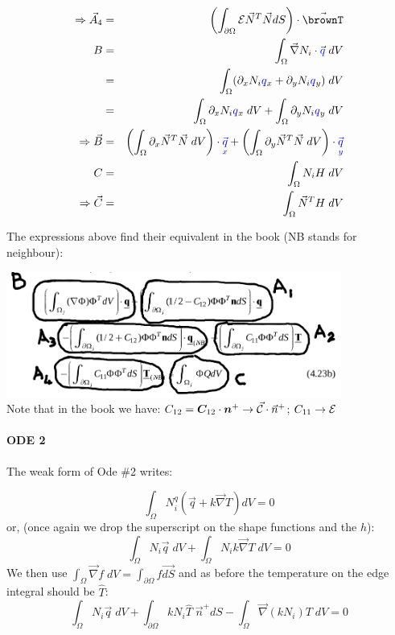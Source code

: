 \begin{eqnarray}
\Rightarrow {\vec A}_4 &=&  \left( \int_{\partial\Omega}   {\cal{E}}   \vec{N}^T \vec{N} dS \right) \cdot \vec{\brownT} \\ 
B 
&=& \int_{\Omega} \vec{\nabla} {N_i} \cdot \vec{\color{blue} q} \; dV  \nn \\
&=& \int_{\Omega} (\partial_x N_i {\color{blue}q}_x + \partial_y N_i {\color{blue}q}_y )   \; dV  \nn \\
&=& \int_{\Omega} \partial_x N_i {\color{blue}q}_x   \; dV   
 +  \int_{\Omega} \partial_y N_i {\color{blue}q}_y   \; dV  \nn \\
\Rightarrow {\vec B} &=& 
  \left(\int_{\Omega} \partial_x \vec{N}^T \vec{N}   \; dV \right)\cdot {\color{blue}\vec{\qx}}  
+ \left(\int_{\Omega} \partial_y \vec{N}^T \vec{N}   \; dV \right)\cdot {\color{blue}\vec{\qy}}  \\
C &=& \int_{\Omega} {N_i} H  \;dV \nn \\
\Rightarrow {\vec C} &=& \int_{\Omega} \vec{N}^T H  \;dV  
\end{eqnarray}


The expressions above find their equivalent in the book (NB stands for neighbour):
\begin{center}
\includegraphics[width=11cm]{images/dgfem/li_01}\\
{\captionfont Note that in the book we have: $C_{12}={\bm C}_{12}\cdot {\bm n}^+ \rightarrow \vec{\cal C}\cdot\vec{n}^+$;
$C_{11} \rightarrow {\cal E}$}
\end{center}






\paragraph{ODE 2} The weak form of Ode \#2 writes:

\[
\int_\Omega N_i^q (\vec{q} + k\vec{\nabla } T ) dV = 0
\]
or, (once again we drop the superscript on the shape functions and the $h$):
\[
\int_\Omega N_i \vec{q} \;  dV + \int_\Omega N_i k\vec{\nabla } T \; dV = 0
\]
We then use $\int_\Omega \vec\nabla f \; dV = \int_{\partial\Omega} f \vec{dS}$
and as before the temperature on the edge integral should be $\hat{T}$:
\[
\int_\Omega N_i \vec{q} \;  dV + \int_{\partial\Omega}  k N_i \hat{T} \; \vec{n}^+  dS - \int_\Omega \vec\nabla (k N_i)   T \; dV = 0
\]


